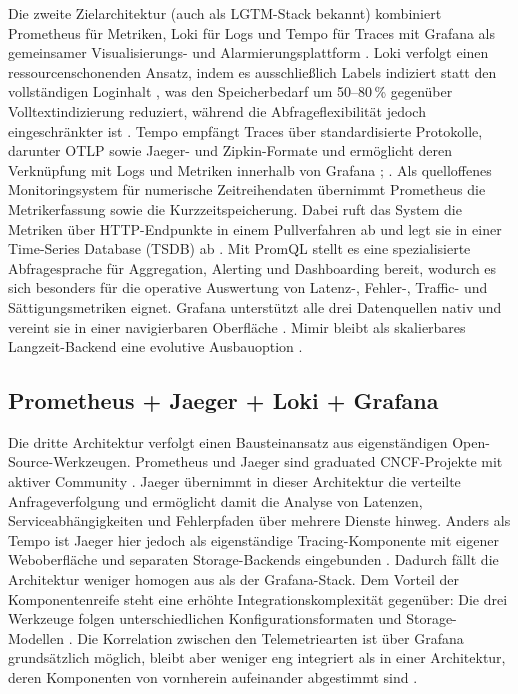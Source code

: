Die zweite Zielarchitektur (auch als LGTM-Stack bekannt) kombiniert Prometheus für Metriken, Loki für Logs und Tempo für Traces mit Grafana als gemeinsamer Visualisierungs- und Alarmierungsplattform \parencite[S.~501]{gudimetla2025transitioning}. Loki verfolgt einen ressourcenschonenden Ansatz, indem es ausschließlich Labels indiziert statt den vollständigen Loginhalt \parencite[S.~72019--72020]{faseeha2025observability}, was den Speicherbedarf um 50--80\,\% gegenüber Volltextindizierung reduziert, während die Abfrageflexibilität jedoch eingeschränkter ist \parencite[S.~502]{gudimetla2025transitioning}. Tempo empfängt Traces über standardisierte Protokolle, darunter OTLP sowie Jaeger- und Zipkin-Formate und ermöglicht deren Verknüpfung mit Logs und Metriken innerhalb von Grafana \parencite{grafana_tempo_docs}; \parencite[S.~8]{tzanettis2022data}. Als quelloffenes Monitoringsystem für numerische Zeitreihendaten übernimmt Prometheus die Metrikerfassung sowie die Kurzzeitspeicherung. Dabei ruft das System die Metriken über HTTP-Endpunkte in einem Pullverfahren ab und legt sie in einer Time-Series Database (TSDB) ab \parencite[S.~72019]{faseeha2025observability}. Mit PromQL stellt es eine spezialisierte Abfragesprache für Aggregation, Alerting und Dashboarding bereit, wodurch es sich besonders für die operative Auswertung von Latenz-, Fehler-, Traffic- und Sättigungsmetriken eignet. Grafana unterstützt alle drei Datenquellen nativ und vereint sie in einer navigierbaren Oberfläche \parencite[S.~16]{sundstrom2025finding}. Mimir bleibt als skalierbares Langzeit-Backend eine evolutive Ausbauoption \parencite[S.~502]{gudimetla2025transitioning}.


\subsection{Prometheus + Jaeger + Loki + Grafana}

Die dritte Architektur verfolgt einen Bausteinansatz aus eigenständigen Open-Source-Werkzeugen. Prometheus und Jaeger sind graduated CNCF-Projekte mit aktiver Community \parencite[S.~15]{giamattei2024monitoring}. Jaeger übernimmt in dieser Architektur die verteilte Anfrageverfolgung und ermöglicht damit die Analyse von Latenzen, Serviceabhängigkeiten und Fehlerpfaden über mehrere Dienste hinweg. Anders als Tempo ist Jaeger hier jedoch als eigenständige Tracing-Komponente mit eigener Weboberfläche und separaten Storage-Backends eingebunden \parencite[S.~72020]{faseeha2025observability}. Dadurch fällt die Architektur weniger homogen aus als der Grafana-Stack. Dem Vorteil der Komponentenreife steht eine erhöhte Integrationskomplexität gegenüber: Die drei Werkzeuge folgen unterschiedlichen Konfigurationsformaten und Storage-Modellen \parencite[S.~501]{gudimetla2025transitioning}. Die Korrelation zwischen den Telemetriearten ist über Grafana grundsätzlich möglich, bleibt aber weniger eng integriert als in einer Architektur, deren Komponenten von vornherein aufeinander abgestimmt sind \parencite[S.~17]{sundstrom2025finding}.


